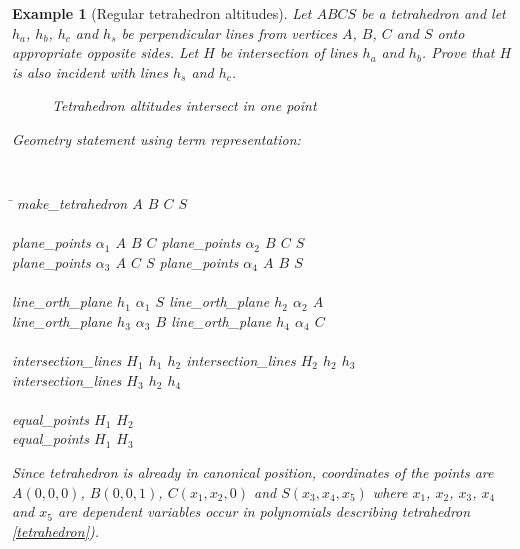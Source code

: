 \documentclass[final,1p,times,authoryear]{elsarticle}
\newtheorem{example}[theorem]{Example}
\begin{document}
\begin{example}[Regular tetrahedron altitudes] 
Let $ABCS$ be a tetrahedron and let $h_a$, $h_b$, $h_c$ and $h_s$ be
perpendicular lines from vertices $A$, $B$, $C$ and $S$ onto
appropriate opposite sides. Let $H$ be intersection of lines $h_a$ and
$h_b$. Prove that $H$ is also incident with lines $h_s$ and $h_c$.

\begin{figure}[!hb]
\begin{center}

\end{center}
\caption{Tetrahedron altitudes intersect in one point}
\end{figure}

Geometry statement using term representation:

\begin{footnotesize}
{\tt
\begin{tabbing}
\hspace{5mm}\=\kill
\> make\_tetrahedron $A$ $B$ $C$ $S$ \ \ \ \ \ \ \ \ \ \ \ \ \= \\ \\

\> plane\_points $\alpha_1$ $A$ $B$ $C$ \> plane\_points $\alpha_2$ $B$ $C$ $S$ \\
\>plane\_points $\alpha_3$ $A$ $C$ $S$ \> plane\_points $\alpha_4$ $A$ $B$ $S$ \\ \\

\>line\_orth\_plane $h_1$ $\alpha_1$ $S$ \> line\_orth\_plane $h_2$ $\alpha_2$ $A$ \\
\>line\_orth\_plane $h_3$ $\alpha_3$ $B$ \> line\_orth\_plane $h_4$ $\alpha_4$ $C$ \\ \\

\>intersection\_lines $H_1$ $h_1$ $h_2$ \> intersection\_lines $H_2$ $h_2$ $h_3$ \\
\>intersection\_lines $H_3$ $h_2$ $h_4$ \\ \\

\>equal\_points $H_1$ $H_2$ \\
\>equal\_points $H_1$ $H_3$ \\
\end{tabbing}
}
\end{footnotesize}

Since tetrahedron is already in canonical position, coordinates of the
points are $A(0, 0, 0)$, $B(0, 0, 1)$, $C(x_1, x_2, 0)$ and $S(x_3,
x_4, x_5)$ where $x_1$, $x_2$, $x_3$, $x_4$ and $x_5$ are dependent
variables occur in polynomials describing tetrahedron
\ref{tetrahedron}).


\end{example}
\end{document}
